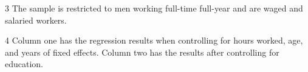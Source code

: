 \begin{table}[!h]
{\begin{threeparttable}
\begin{tablenotes}
\item[3] \footnotesize{The sample is restricted to men working full-time full-year and are waged and salaried workers.}
\item[4] \footnotesize{Column one has the regression results when controlling for hours worked, age, and years of fixed effects. Column two has the results after controlling for education.}
\end{tablenotes}
\end{threeparttable}}
\end{table}
